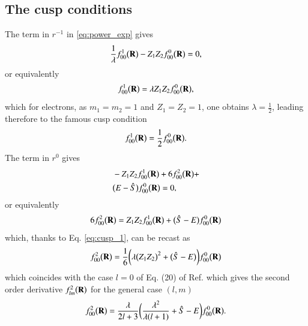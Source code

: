 \documentclass[aip,jcp,reprint,noshowkeys,superscriptaddress]{revtex4-1}
\newcommand{\bd}[1]{{\bf {#1}}}
\begin{document}
\subsection{The cusp conditions}
The term in $r^{-1}$ in \eqref{eq:power_exp} gives
\begin{equation}
 \frac{1}{\lambda} f_{00}^1\big(\bd{R}\big) - Z_1 Z_2 f_{00}^0\big(\bd{R}\big) = 0,
\end{equation}
or equivalently
\begin{equation}
 f_{00}^1\big(\bd{R}\big) = \lambda Z_1 Z_2 f_{00}^0\big(\bd{R}\big), 
\end{equation}
which for electrons, as $m_1 = m_2 = 1$ and $Z_1 = Z_2 = 1$, one obtains $ \lambda = \frac{1}{2}$, leading therefore to the famous cusp condition
\begin{equation}
 \label{eq:cusp_1}
 f_{00}^1\big(\bd{R}\big) = \frac{1}{2} f_{00}^0\big(\bd{R}\big). 
\end{equation}
The term in $r^0$ gives 
\begin{equation}
 \begin{aligned}
& -Z_1 Z_2 f_{00}^1\big(\bd{R}\big) + 6 f_{00}^2\big(\bd{R}\big) + \\
& \big( E - \hat{S} \big) f_{00}^0\big(\bd{R}\big) = 0, 
 \end{aligned}
\end{equation}
or equivalently
\begin{equation}
 \begin{aligned}
  6 f_{00}^2\big(\bd{R}\big) = Z_1 Z_2 f_{00}^1\big(\bd{R}\big) + \big( \hat{S} -E \big) f_{00}^0\big(\bd{R}\big)
 \end{aligned}
\end{equation}
which, thanks to Eq. \eqref{eq:cusp_1}, can be recast as 
\begin{equation}
 \begin{aligned}
 \label{eq:cusp_2}
  f_{00}^2\big(\bd{R}\big) = \frac{1}{6}\bigg( \lambda \big(Z_1 Z_2\big)^2  + \big( \hat{S} -E \big)\bigg) f_{00}^0\big(\bd{R}\big)
 \end{aligned}
\end{equation}
which coincides with the case $l=0$ of Eq. (20) of Ref.  which gives the second order derivative $f_{lm}^2\big(\bd{R}\big)$ for the general case $(l,m)$
\begin{equation}
 f_{00}^2\big(\bd{R}\big) = \frac{\lambda}{2l+3}\bigg( \frac{\lambda^2}{\lambda(l+1)} + \hat{S} -E \bigg) f_{00}^0\big(\bd{R}\big). 
\end{equation}
\end{document}
